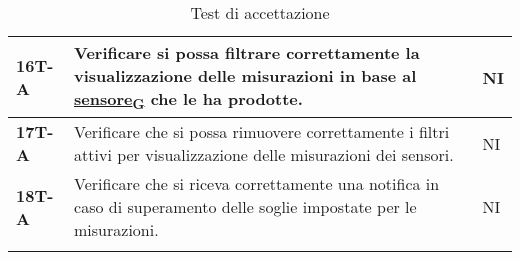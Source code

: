 \begin{longtable}{|>{\raggedright\arraybackslash}m{}|>{\raggedright\arraybackslash}m{}|>{\raggedright\arraybackslash}m{}|}
	\hline
	\textbf{16T-A}  & Verificare si possa filtrare correttamente la visualizzazione delle misurazioni in base al \href{https://7last.github.io/docs/rtb/documentazione-interna/glossario\#sensore}{sensore\textsubscript{G}} che le ha prodotte. & NI             \\
	\hline
	\textbf{17T-A}  & Verificare che si possa rimuovere correttamente i filtri attivi per visualizzazione delle misurazioni dei sensori.     & NI             \\
	\hline
	\textbf{18T-A}  & Verificare che si riceva correttamente una notifica in caso di superamento delle soglie impostate per le misurazioni.  & NI             \\
	\hline
	\caption{Test di accettazione}
\end{longtable}
